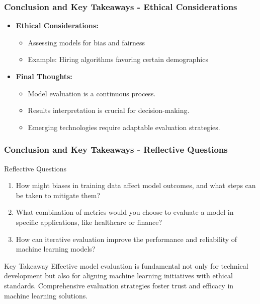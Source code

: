 \documentclass[aspectratio=169]{beamer}
\begin{document}
\begin{frame}[fragile]
    \frametitle{Conclusion and Key Takeaways - Ethical Considerations}
    \begin{itemize}
        \item \textbf{Ethical Considerations:}
        \begin{itemize}
            \item Assessing models for bias and fairness
            \item Example: Hiring algorithms favoring certain demographics
        \end{itemize}
        
        \item \textbf{Final Thoughts:}
        \begin{itemize}
            \item Model evaluation is a continuous process.
            \item Results interpretation is crucial for decision-making.
            \item Emerging technologies require adaptable evaluation strategies.
        \end{itemize}
    \end{itemize}
\end{frame}

\begin{frame}[fragile]
    \frametitle{Conclusion and Key Takeaways - Reflective Questions}
    \begin{block}{Reflective Questions}
        \begin{enumerate}
            \item How might biases in training data affect model outcomes, and what steps can be taken to mitigate them?
            \item What combination of metrics would you choose to evaluate a model in specific applications, like healthcare or finance?
            \item How can iterative evaluation improve the performance and reliability of machine learning models?
        \end{enumerate}
    \end{block}

    \begin{block}{Key Takeaway}
        Effective model evaluation is fundamental not only for technical development but also for aligning machine learning initiatives with ethical standards. Comprehensive evaluation strategies foster trust and efficacy in machine learning solutions.
    \end{block}
\end{frame}
\end{document}
